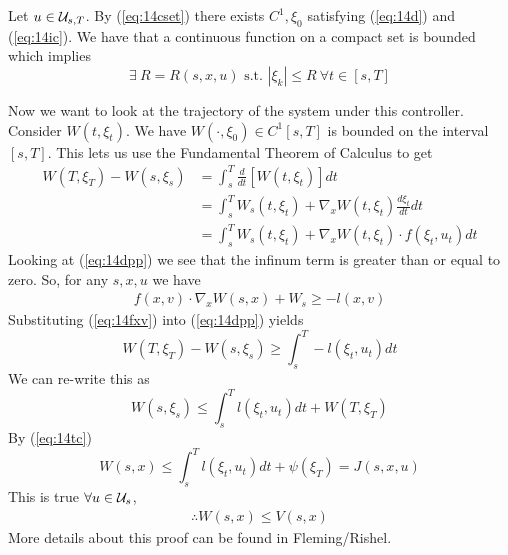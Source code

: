 Let $u\in\mathcal{U}_{s,T}$. By (\ref{eq:14cset}) there exists $C^1, \xi_0$ satisfying (\ref{eq:14d}) and (\ref{eq:14ic}). We have that a continuous function on a compact set is bounded which implies
$$\exists~ R=R(s,x,u) \text{ s.t. } |\xi_k|\leq R ~\forall t\in[s,T]$$

Now we want to look at the trajectory of the system under this controller. Consider $W(t,\xi_t)$. We have $W(\cdot,\xi_0)\in C^1[s,T]$ is bounded on the interval $[s,T]$. This lets us use the Fundamental Theorem of Calculus to get
\begin{align*}
W(T,\xi_T) - W(s,\xi_s) &= \int_s^T \frac{d}{dt}[W(t,\xi_t)]dt \\
&= \int_s^T W_s(t,\xi_t) + \nabla_x W(t,\xi_t) \frac{d\xi_t}{dt}dt \\
&= \int_s^TW_s(t,\xi_t) + \nabla_x W(t,\xi_t)\cdot f(\xi_t,u_t)dt
\end{align*}
Looking at (\ref{eq:14dpp}) we see that the infinum term is greater than or equal to zero. So, for any $s,x,u$ we have
\begin{align}
\label{eq:14fxv}
f(x,v)\cdot\nabla_xW(s,x)+W_s \geq -l(x,v)
\end{align}
Substituting (\ref{eq:14fxv}) into (\ref{eq:14dpp}) yields
$$W(T,\xi_T) - W(s,\xi_s) \geq \int_s^T -l(\xi_t,u_t)dt$$
We can re-write this as
$$W(s,\xi_s) \leq \int_s^T l(\xi_t,u_t)dt + W(T,\xi_T)$$
By (\ref{eq:14tc})
$$W(s,x) \leq \int_s^T l(\xi_t,u_t)dt + \psi(\xi_T) = J(s,x,u)$$
This is true $\forall u\in\mathcal{U}_s$,
\begin{align}
\label{eq:14wv}
\therefore W(s,x) \leq V(s,x)
\end{align}
More details about this proof can be found in Fleming/Rishel.

